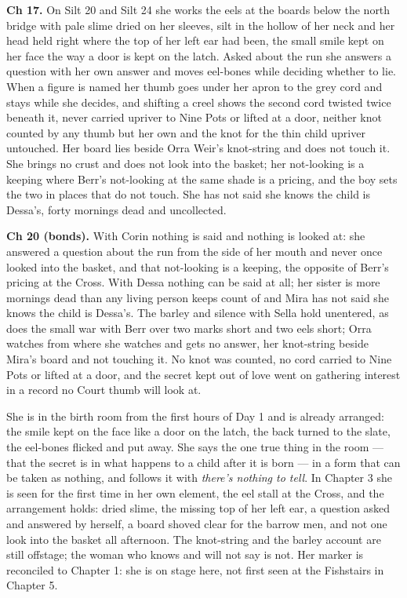 \documentclass{design/chronicle}
\begin{document}
{\textbf{Ch 17.} On Silt 20 and Silt 24 she works the eels at the boards below the north bridge with pale slime dried on her sleeves, silt in the hollow of her neck and her head held right where the top of her left ear had been, the small smile kept on her face the way a door is kept on the latch. Asked about the run she answers a question with her own answer and moves eel-bones while deciding whether to lie. When a figure is named her thumb goes under her apron to the grey cord and stays while she decides, and shifting a creel shows the second cord twisted twice beneath it, never carried upriver to Nine Pots or lifted at a door, neither knot counted by any thumb but her own and the knot for the thin child upriver untouched. Her board lies beside Orra Weir’s knot-string and does not touch it. She brings no crust and does not look into the basket; her not-looking is a keeping where Berr’s not-looking at the same shade is a pricing, and the boy sets the two in places that do not touch. She has not said she knows the child is Dessa’s, forty mornings dead and uncollected.

\textbf{Ch 20 (bonds).} With Corin nothing is said and nothing is looked at: she answered a question about the run from the side of her mouth and never once looked into the basket, and that not-looking is a keeping, the opposite of Berr’s pricing at the Cross. With Dessa nothing can be said at all; her sister is more mornings dead than any living person keeps count of and Mira has not said she knows the child is Dessa’s. The barley and silence with Sella hold unentered, as does the small war with Berr over two marks short and two eels short; Orra watches from where she watches and gets no answer, her knot-string beside Mira’s board and not touching it. No knot was counted, no cord carried to Nine Pots or lifted at a door, and the secret kept out of love went on gathering interest in a record no Court thumb will look at.

She is in the birth room from the first hours of Day 1 and is already arranged: the smile kept on the face like a door on the latch, the back turned to the slate, the eel-bones flicked and put away. She says the one true thing in the room --- that the secret is in what happens to a child after it is born --- in a form that can be taken as nothing, and follows it with \emph{there’s nothing to tell}. In Chapter 3 she is seen for the first time in her own element, the eel stall at the Cross, and the arrangement holds: dried slime, the missing top of her left ear, a question asked and answered by herself, a board shoved clear for the barrow men, and not one look into the basket all afternoon. The knot-string and the barley account are still offstage; the woman who knows and will not say is not. Her marker is reconciled to Chapter 1: she is on stage here, not first seen at the Fishstairs in Chapter 5.

}
\end{document}
